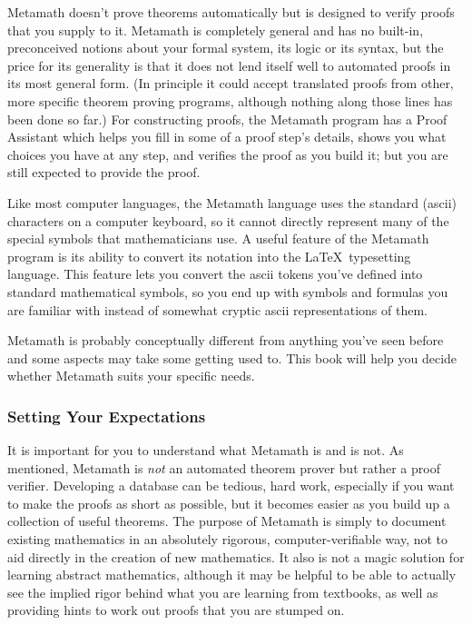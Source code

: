 Metamath doesn't prove theorems automatically but is designed to verify proofs
that you supply to it.  Metamath is completely general and has no built-in,
preconceived notions about your formal system, its logic
or its syntax, but the price for its generality is that it does not lend
itself well to automated proofs in its most general form.  (In principle it
could accept translated proofs from other, more specific theorem proving
programs, although nothing along those lines has been done so far.)  For
constructing proofs, the Metamath program has a Proof Assistant which helps you fill in some of a proof step's details, shows you
what choices you have at any step, and verifies the proof as you build it; but
you are still expected to provide the proof.

Like most computer languages, the Metamath language uses the
standard ({\sc ascii}) characters on a computer keyboard, so it cannot
directly represent many of the special symbols that mathematicians use.  A
useful feature of the Metamath program is its ability to convert its notation
into the \LaTeX\ typesetting language.  This feature
lets you convert the {\sc ascii} tokens you've defined into standard
mathematical symbols, so you end up with symbols and formulas you are familiar
with instead of somewhat cryptic {\sc ascii} representations of them.

Metamath is probably conceptually different from anything you've seen
before and some aspects may take some getting used to.  This book will
help you decide whether Metamath suits your specific needs.

\subsubsection{Setting Your Expectations}
It is important for you to understand what Metamath is and is
not.  As mentioned, Metamath is {\em not} an automated theorem prover but
rather a proof verifier.  Developing a database can be tedious, hard work,
especially if you want to make the proofs as short as possible, but it becomes
easier as you build up a collection of useful theorems.  The purpose of
Metamath is simply to document existing mathematics in an absolutely rigorous,
computer-verifiable way, not to aid directly in the creation of new
mathematics.  It also is not a magic solution for learning abstract
mathematics, although it may be helpful to be able to actually see the implied
rigor behind what you are learning from textbooks, as well as providing hints
to work out proofs that you are stumped on.

